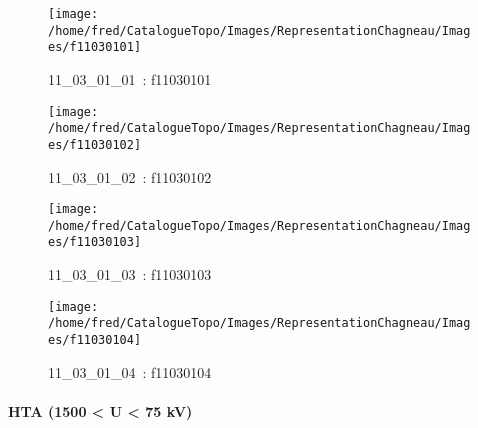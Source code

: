 \documentclass[12pt,titlepage]{book}
\begin{document}
\begin{figure}[h!]
  \hfill         %
  \begin{minipage}[t]{3cm}
    \begin{center}
      \texttt{[image: /home/fred/CatalogueTopo/Images/RepresentationChagneau/Images/f11030101]}
      \caption[~11\_03\_01\_01]{\small{11\_03\_01\_01~:} \tiny{f11030101}}\label{f11030101}
    \end{center}
  \end{minipage}
  \begin{minipage}[t]{3cm}
    \begin{center}
      \texttt{[image: /home/fred/CatalogueTopo/Images/RepresentationChagneau/Images/f11030102]}
      \caption[~11\_03\_01\_02]{\small{11\_03\_01\_02~:} \tiny{f11030102}}\label{f11030102}
    \end{center}
  \end{minipage}
  \begin{minipage}[t]{3cm}
    \begin{center}
      \texttt{[image: /home/fred/CatalogueTopo/Images/RepresentationChagneau/Images/f11030103]}
      \caption[~11\_03\_01\_03]{\small{11\_03\_01\_03~:} \tiny{f11030103}}\label{f11030103}
    \end{center}
  \end{minipage}
  \begin{minipage}[t]{3cm}
    \begin{center}
      \texttt{[image: /home/fred/CatalogueTopo/Images/RepresentationChagneau/Images/f11030104]}
      \caption[~11\_03\_01\_04]{\small{11\_03\_01\_04~:} \tiny{f11030104}}\label{f11030104}
    \end{center}
  \end{minipage}
\end{figure}


\paragraph{HTA (1500 < U < 75 kV)}
\noindent
\vspace{\baselineskip}
\end{document}
